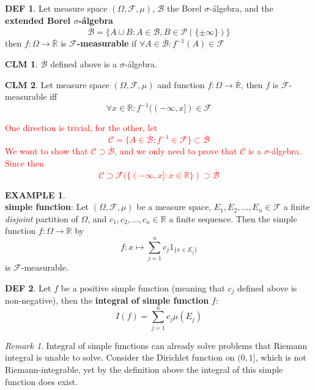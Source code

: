 \documentclass[hidelinks]{article}
\theoremstyle{definition}
\newtheorem*{defin}{DEF}
\newtheorem*{eg}{EXAMPLE}
\theoremstyle{dotless}
\newtheorem{claim}{CLM}[section]
\theoremstyle{remark}
\newtheorem*{remark}{Remark}
\begin{document}
\begin{defin}
Let measure space $(\Omega,\mathscr{F},\mu)$, $\mathscr{B}$ the Borel $\sigma$-álgebra, and the \textbf{extended Borel $\sigma$-álgebra} \[\overline{\mathscr{B}}=\{A\cup B:A\in\mathscr{B},B\in\mathscr{P}(\{\pm\infty\})\}\]
then $f:\Omega\to\overline{\mathbb{R}}$ is \textbf{$\mathscr{F}$-measurable} if $\forall A\in\overline{\mathscr{B}}:f^{-1}(A)\in\mathscr{F}$
\end{defin}

\begin{claim}
$\overline{\mathscr{B}}$ defined above is a $\sigma$-álgebra.
\end{claim}

\begin{claim}\label{CLM 8.15}
Let measure space $(\Omega,\mathscr{F},\mu)$ and function $f:\Omega\to\overline{\mathbb{R}}$, then $f$ is $\mathscr{F}$-measurable iff \[\forall x\in\mathbb{R}:f^{-1}((-\infty,x])\in\mathscr{F}\]
\end{claim}
\textcolor{red}{One direction is trivial, for the other, let
\[\mathscr{C}=\{A\in\overline{\mathscr{B}}:f^{-1}\in\mathscr{F}\}\subset\overline{\mathscr{B}}\]
We want to show that $\mathscr{C}\supset\overline{\mathscr{B}}$, and we only need to prove that $\mathscr{C}$ is a $\sigma$-álgebra. Since then
\[\mathscr{C}\supset\mathscr{F}(\{(-\infty,x]:x\in\mathbb{R}\})\supset\overline{\mathscr{B}}\]}

\begin{eg}~\\
\textbf{simple function}: Let $(\Omega,\mathscr{F},\mu)$ be a measure space, $E_1,E_2,...,E_n\in\mathscr{F}$ a finite \emph{disjoint} partition of $\Omega$, and $c_1,c_2,...,c_n\in\mathbb{R}$ a finite sequence. Then the simple function $f:\Omega\to\mathbb{R}$ by \[f:x\mapsto\sum_{j=1}^nc_j1_{\{x\in E_j\}}\]
is $\mathscr{F}$-measurable.
\end{eg}

\begin{defin}
Let $f$ be a positive simple function (meaning that $c_j$ defined above is non-negative), then the \textbf{integral of simple function} $f$:
\[I(f)=\sum_{j=1}^nc_j\mu(E_j)\]
\end{defin}

\begin{remark}
Integral of simple functions can already solve problems that Riemann integral is unable to solve. Consider the Dirichlet function on $(0,1]$, which is not Riemann-integrable, yet by the definition above the integral of this simple function does exist.
\end{remark}
\end{document}
